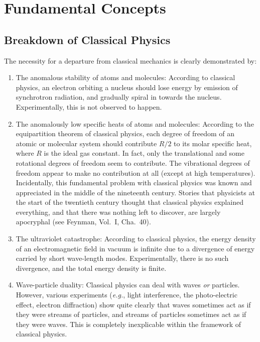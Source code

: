 \chapter{Fundamental Concepts}
\section{Breakdown of Classical Physics}
The necessity for a departure from
classical mechanics is clearly demonstrated by:
\begin{enumerate}
\item {\sf The anomalous stability of atoms and molecules:} According to classical
physics, an electron orbiting a nucleus should lose energy by emission
of synchrotron radiation, and gradually spiral in towards the nucleus. Experimentally,
this is not observed to happen.
\item {\sf The anomalously low specific heats of atoms and molecules:} According to
the equipartition theorem of classical physics, each degree of freedom of
an atomic or molecular system should contribute $R/2$ to its molar specific heat, where $R$ is the ideal gas constant.
In fact, only the translational and some rotational degrees of freedom seem
to contribute. The vibrational degrees of freedom appear to make no contribution
at all
(except at high temperatures). Incidentally, this fundamental 
problem with classical physics was known and appreciated in the middle of the
nineteenth century. Stories that physicists at the start of the twentieth century thought that
classical physics explained everything, and that there was nothing left to
discover, are largely apocryphal (see  Feynman, Vol.~I, Cha.~40).
\item {\sf The ultraviolet catastrophe:} According to classical physics, the energy
density of an electromagnetic field in vacuum is infinite due to a divergence of
energy carried by short wave-length modes. Experimentally, there is no such
divergence,  and the total energy density is finite. 
\item {\sf Wave-particle duality:} Classical physics can deal with waves {\em or}
particles. However, various experiments ({\em e.g.}, light interference, the photo-electric effect,
electron diffraction) show quite clearly that waves sometimes act as if they
were streams of particles, and streams of particles sometimes act as if they 
were waves. This is completely inexplicable within the framework of
classical physics. 
\end{enumerate}

